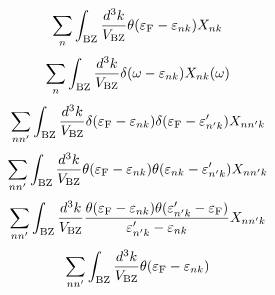 \documentclass[letterpaper,10pt,dvipdfmx,openany]{sphinxmanual}
\begin{document}
\begin{equation*}
\begin{split}\begin{align}
\sum_{n}
\int_{\rm BZ} \frac{d^3 k}{V_{\rm BZ}}
\theta(\varepsilon_{\rm F} - \varepsilon_{n k})
X_{n k}
\end{align}\end{split}
\end{equation*}\begin{equation*}
\begin{split}\begin{align}
\sum_{n}
\int_{\rm BZ} \frac{d^3 k}{V_{\rm BZ}}
\delta(\omega - \varepsilon_{n k})
X_{n k}(\omega)
\end{align}\end{split}
\end{equation*}\begin{equation*}
\begin{split}\begin{align}
\sum_{n n'}
\int_{\rm BZ} \frac{d^3 k}{V_{\rm BZ}}
\delta(\varepsilon_{\rm F} - \varepsilon_{n k})
\delta(\varepsilon_{\rm F} - \varepsilon'_{n' k})
X_{n n' k}
\end{align}\end{split}
\end{equation*}\begin{equation*}
\begin{split}\begin{align}
\sum_{n n'}
\int_{\rm BZ} \frac{d^3 k}{V_{\rm BZ}}
\theta(\varepsilon_{\rm F} - \varepsilon_{n k})
\theta(\varepsilon_{n k} - \varepsilon'_{n' k})
X_{n n' k}
\end{align}\end{split}
\end{equation*}\begin{equation*}
\begin{split}\begin{align}
\sum_{n n'}
\int_{\rm BZ} \frac{d^3 k}{V_{\rm BZ}}
\frac{
\theta(\varepsilon_{\rm F} - \varepsilon_{n k})
\theta(\varepsilon'_{n' k} - \varepsilon_{\rm F})}
{\varepsilon'_{n' k} - \varepsilon_{n k}}
X_{n n' k}
\end{align}\end{split}
\end{equation*}\begin{equation*}
\begin{split}\begin{align}
\sum_{n n'}
\int_{\rm BZ} \frac{d^3 k}{V_{\rm BZ}}
\theta(\varepsilon_{\rm F} - \varepsilon_{n k})

\end{align}
\end{split}
\end{equation*}
\end{document}
